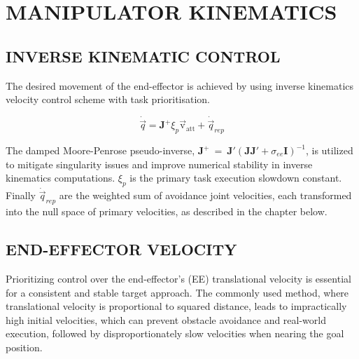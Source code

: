 \documentclass[letterpaper, 10 pt, conference]{ieeeconf}  %
\begin{document}
\section{MANIPULATOR KINEMATICS}

\subsection{INVERSE KINEMATIC CONTROL}

The desired movement of the end-effector is achieved by using inverse kinematics velocity control scheme with task prioritisation. 

\begin{equation}
	\dot{\vec{q}} = \mathbf{J}^+ \xi_{p} \mathrm{\vec{v}_{att}} + \dot{\vec{q}}_{rep}
\end{equation}

The damped Moore-Penrose pseudo-inverse, \(\mathbf{J}^+~=~\mathbf{J}'(\mathbf{J}\mathbf{J}' + \sigma_{ee} \mathbf{I})^{-1}\), is utilized to mitigate singularity issues and improve numerical stability in inverse kinematics computations. $\xi_{p}$ is the primary task execution slowdown constant. Finally $\dot{\vec{q}}_{rep}$ are the weighted sum of avoidance joint velocities, each transformed into the null space of primary velocities, as described in the chapter below. 


\subsection{END-EFFECTOR VELOCITY}

Prioritizing control over the end-effector's (EE) translational velocity is essential for a consistent and stable target approach. The commonly used method, where translational velocity is proportional to squared distance, leads to impractically high initial velocities, which can prevent obstacle avoidance and real-world execution, followed by disproportionately slow velocities when nearing the goal position. 

\end{document}
